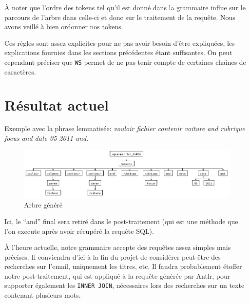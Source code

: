 À noter que l'ordre des tokens tel qu'il est donné dans la grammaire influe sur le parcours de l'arbre dans celle-ci et donc sur le traitement de la requête. Nous avons veillé à bien ordonner nos tokens.

\medskip

Ces règles sont assez explicites pour ne pas avoir besoin d'être expliquées, les explications fournies dans les sections précédentes étant suffisantes. On peut cependant préciser que \lstinline{WS} permet de ne pas tenir compte de certaines chaînes de caractères.

\section{Résultat actuel}

Exemple avec la phrase lemmatisée: \textit{vouloir fichier contenir voiture and rubrique focus and date 05 2011 and}.

\begin{figure}[H]
    \centering\includegraphics[width=1\textwidth]{images/arbre.png}
    \caption{Arbre généré}
\end{figure}

\noindent Ici, le ``and'' final sera retiré dans le post-traitement (qui est une méthode que l'on execute après avoir récupéré la requête SQL).

\bigskip
\bigskip

À l'heure actuelle, notre grammaire accepte des requêtes assez simples mais précises. Il conviendra d'ici à la fin du projet de considérer peut-être des recherches sur l'email, uniquement les titres, etc. Il faudra probablement étoffer notre post-traitement, qui est appliqué à la requête générée par Antlr, pour supporter également les \sql\lstinline{INNER JOIN}, nécessaires lors des recherches sur un texte contenant plusieurs mots.
